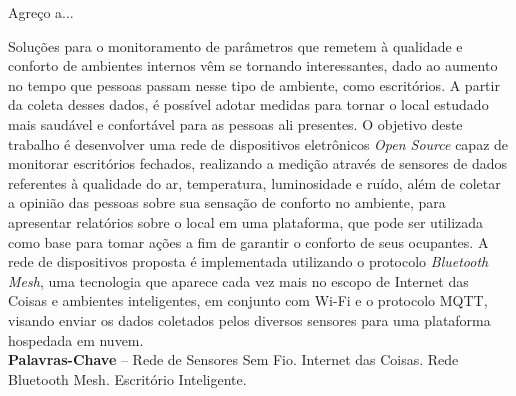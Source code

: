 \documentclass[]{politex}
\begin{document}
\capa

\falsafolhaderosto

\folhaderosto




\begin{agradecimentos}
	Agreço a...
\end{agradecimentos}

\begin{resumo}

Soluções para o monitoramento de parâmetros que remetem à qualidade e conforto de ambientes internos vêm se tornando interessantes, dado ao aumento no tempo que pessoas passam nesse tipo de ambiente, como escritórios. A partir da coleta desses dados, é possível adotar medidas para tornar o local estudado mais saudável e confortável para as pessoas ali presentes. O objetivo deste trabalho é desenvolver uma rede de dispositivos eletrônicos \textit{Open Source} capaz de monitorar escritórios fechados, realizando a medição através de sensores de dados referentes à qualidade do ar, temperatura, luminosidade e ruído, além de coletar a opinião das pessoas sobre sua sensação de conforto no ambiente, para apresentar relatórios sobre o local em uma plataforma, que pode ser utilizada como base para tomar ações a fim de garantir o conforto de seus ocupantes. A rede de dispositivos proposta é implementada utilizando o protocolo \textit{Bluetooth Mesh}, uma tecnologia que aparece cada vez mais no escopo de Internet das Coisas e ambientes inteligentes, em conjunto com Wi-Fi e o protocolo MQTT, visando enviar os dados coletados pelos diversos sensores para uma plataforma hospedada em nuvem. 
%
\\[3\baselineskip]
%
\textbf{Palavras-Chave} -- Rede de Sensores Sem Fio. Internet das Coisas. Rede Bluetooth Mesh. Escritório Inteligente. 
\end{resumo}
\end{document}
